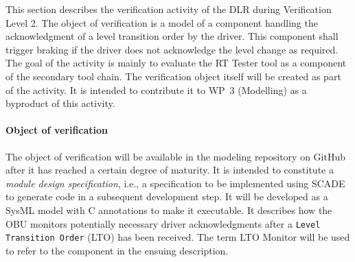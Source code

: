 



%



This section describes the verification activity of the DLR during
Verification Level 2. The object of verification is 
a model of a component handling the acknowledgment  of a level
transition order by the driver. This component shall trigger braking if
the driver does not acknowledge the level change as required. The goal
of the activity is mainly to evaluate the RT Tester tool as a
component of the secondary tool chain. The verification object itself
will be created as part of the activity. It is intended to contribute
it to WP~3 (Modelling) as a byproduct of this activity.


\paragraph{Object of verification}
The object of verification will be available in the modeling
repository on GitHub after it has reached a certain degree of
maturity. It is intended to constitute a \emph{module design
  specification}, i.e., a specification to be implemented using SCADE
to generate code in a subsequent development step. It will be
developed as a SysML model with C annotations to make it
executable. It describes how the OBU monitors potentially
necessary driver acknowledgments after a \texttt{Level Transition
  Order} (LTO) has been received.  The term LTO Monitor will be used
to refer to the component in the ensuing description.

